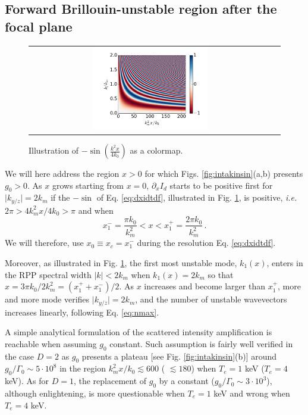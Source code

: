 \documentclass[
 reprint,
 amsmath,amssymb,
 aps,
]{revtex4-1}
\begin{document}
\subsection{Forward Brillouin-unstable region after the focal plane}
\begin{figure}[!]
\begin{tabular}{cc}
\includegraphics[width=0.49\textwidth]{sin2.png}\\
\end{tabular}
\caption{ \label{fig:sin2} Illustration of $-\sin\left({\frac{ k^2x}{4k_0}}  \right)$ as a colormap.}
\end{figure}
We will here address the region $x>0$ for which Figs. \ref{fig:intakinsin}(a,b) presents $g_0>0$.
As $x$ grows starting from  $x=0$,  $\partial_x I_d$ starts to be positive  first for  $\vert k_{y/z} \vert= 2k_m$  if the $-\sin$ of Eq. \eqref{eq:dxidtdf}, illustrated in Fig. \ref{fig:sin2}, is positive, \emph{i.e.} $2\pi>4k_m^2x/4k_0>\pi$ and  when 
\begin{equation}\label{eq:xc}
x_1^- = \frac{\pi k_0 }{k_m^2}  <x < x_1^+ = \frac{2\pi k_0 }{k_m^2} \, .
\end{equation}
We will therefore,  use $x_0\equiv x_c=x_1^-$ during the resolution  Eq. \eqref{eq:dxidtdf}. 

Moreover, as illustrated in Fig. \ref{fig:sin2}, the first most unstable mode, $k_1(x)$, enters in the  RPP spectral width $\vert k \vert< 2k_m$ when $k_1(x)=2k_m$ so that 
$x=3\pi k_0 /2k_m^2=(x_1^++x_1^-)/2$. As $x$ increases and become larger than $x_1^+$, more and more mode verifies $\vert k_{y/z} \vert= 2k_m$, and the number of unstable wavevectors increases linearly, following Eq. \eqref{eq:nmax}.

A simple analytical formulation of the scattered  intensity amplification is reachable  when assuming $g_0$ constant. Such assumption is fairly well verified in the case $D=2$ as $g_0$ presents a plateau [see Fig. \ref{fig:intakinsin}(b)]  around $g_0/\Gamma_0\sim 5\cdot 10^{8}$  in the region $k_m^2x/k_0  \lesssim  600 $ ( $  \lesssim  180 $) when $T_e=1$ keV ($T_e=4$ keV). As for $D=1$, the replacement of  $g_0$ by a constant ($g_0/\Gamma_0\sim 3\cdot 10^{3}$), although enlightening, is more questionable when  $T_e=1$ keV and wrong when $T_e=4$ keV. 
\end{document}
